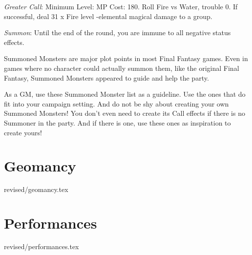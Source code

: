 \begin{multicols}{2}
    \textit{Greater Call}: Minimum Level:  MP Cost: 180. Roll Fire vs Water, trouble 0. If successful, deal 31 x Fire level -elemental magical damage to a group.
    
    \textit{Summon}: Until the end of the round, you are immune to all negative status effects.

\begin{mog}
    \baselineskip=13pt
    Summoned Monsters are major plot points in most Final Fantasy games. Even in games where no character could actually summon them, like the original Final Fantasy, Summoned Monsters appeared to guide and help the party. \pc%

    As a GM, use these Summoned Monster list as a guideline. Use the ones that do fit into your campaign setting. And do not be shy about creating your own Summoned Monsters! You don't even need to create its Call effects if there is no Summoner in the party. And if there is one, use these ones as inspiration to create yours!
\end{mog}
\end{multicols}
\clearpage
\section{Geomancy}\label{sec:magic-geomancy}
 {revised/geomancy.tex}

\section{Performances}\label{sec:magic-performances}
 {revised/performances.tex}
